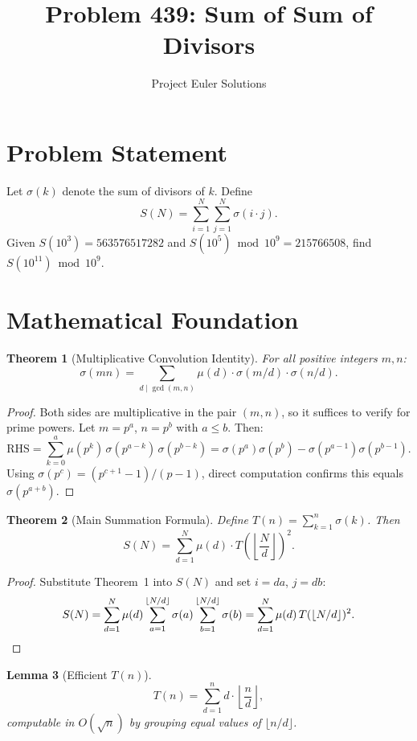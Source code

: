 \documentclass[11pt]{article}
\title{Problem 439: Sum of Sum of Divisors}
\author{Project Euler Solutions}
\date{}
\newtheorem{theorem}{Theorem}
\newtheorem{lemma}[theorem]{Lemma}
\begin{document}
\maketitle

\section{Problem Statement}
Let $\sigma(k)$ denote the sum of divisors of $k$. Define
\[
S(N) = \sum_{i=1}^{N}\sum_{j=1}^{N} \sigma(i \cdot j).
\]
Given $S(10^3) = 563576517282$ and $S(10^5) \bmod 10^9 = 215766508$, find $S(10^{11}) \bmod 10^9$.

\section{Mathematical Foundation}

\begin{theorem}[Multiplicative Convolution Identity]
For all positive integers $m, n$:
\[
\sigma(mn) = \sum_{d \mid \gcd(m,n)} \mu(d) \cdot \sigma(m/d) \cdot \sigma(n/d).
\]
\end{theorem}

\begin{proof}
Both sides are multiplicative in the pair $(m, n)$, so it suffices to verify for prime powers. Let $m = p^a$, $n = p^b$ with $a \leq b$. Then:
\[
\text{RHS} = \sum_{k=0}^{a} \mu(p^k)\,\sigma(p^{a-k})\,\sigma(p^{b-k}) = \sigma(p^a)\sigma(p^b) - \sigma(p^{a-1})\sigma(p^{b-1}).
\]
Using $\sigma(p^c) = (p^{c+1}-1)/(p-1)$, direct computation confirms this equals $\sigma(p^{a+b})$.
\end{proof}

\begin{theorem}[Main Summation Formula]
Define $T(n) = \sum_{k=1}^n \sigma(k)$. Then
\[
S(N) = \sum_{d=1}^{N} \mu(d) \cdot T\!\left(\left\lfloor \frac{N}{d}\right\rfloor\right)^{\!2}.
\]
\end{theorem}

\begin{proof}
Substitute Theorem~1 into $S(N)$ and set $i = da$, $j = db$:
\[
S(N) = \sum_{d=1}^N \mu(d) \sum_{a=1}^{\lfloor N/d \rfloor} \sigma(a) \sum_{b=1}^{\lfloor N/d \rfloor} \sigma(b) = \sum_{d=1}^N \mu(d)\, T(\lfloor N/d \rfloor)^2. \qedhere
\]
\end{proof}

\begin{lemma}[Efficient $T(n)$]
\[
T(n) = \sum_{d=1}^n d \cdot \left\lfloor \frac{n}{d}\right\rfloor,
\]
computable in $O(\sqrt{n})$ by grouping equal values of $\lfloor n/d \rfloor$.
\end{lemma}
\end{document}
